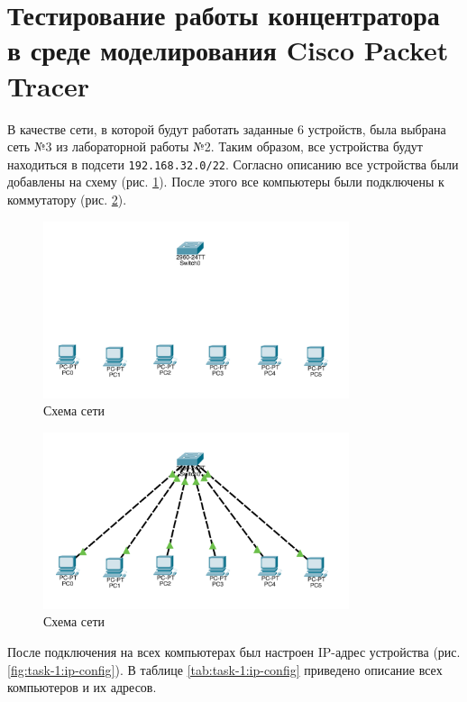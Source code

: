 \documentclass[a4paper, 14pt]{extarticle}
\begin{document}
\section{Тестирование работы концентратора в среде моделирования Cisco Packet Tracer}

В качестве сети, в которой будут работать заданные 6 устройств, была выбрана
сеть №3 из лабораторной работы №2. Таким образом, все устройства будут
находиться в подсети \texttt{192.168.32.0/22}. Согласно описанию все устройства
были добавлены на схему (рис. \ref{fig:task-1:scheme-1}). После этого все
компьютеры были подключены к коммутатору (рис. \ref{fig:task-1:scheme-2}).

\begin{figure}[H]
  \centering
  \includegraphics[width=0.8\textwidth]{images/task-1/scheme-1.png}
  \caption{Схема сети}
  \label{fig:task-1:scheme-1}
\end{figure}

\begin{figure}[H]
  \centering
  \includegraphics[width=0.8\textwidth]{images/task-1/scheme-2.png}
  \caption{Схема сети}
  \label{fig:task-1:scheme-2}
\end{figure}

После подключения на всех компьютерах был настроен IP-адрес устройства (рис.
\ref{fig:task-1:ip-config}). В таблице \ref{tab:task-1:ip-config} приведено
описание всех компьютеров и их адресов.
\end{document}
